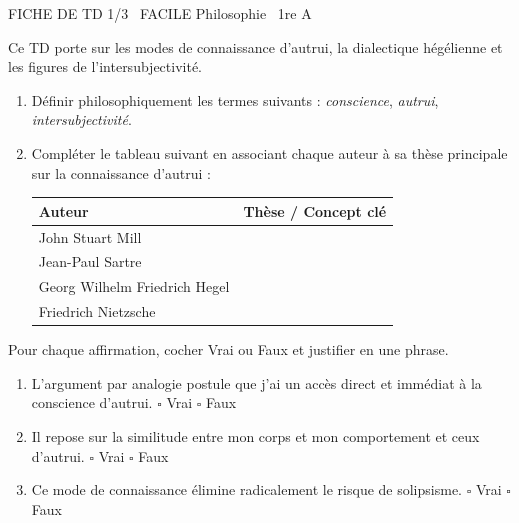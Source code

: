 \documentclass[11pt]{article}
\begin{document}
\begin{tcolorbox}[enhanced,colback=popink,colframe=popink,arc=10pt,boxrule=0pt,left=12pt,right=12pt,top=9pt,bottom=9pt]
{\color{white}\popxbold\small FICHE DE TD 1/3 \textbullet\ FACILE \hfill Philosophie \textbullet\ 1re A\par}
\end{tcolorbox}
\vspace{4pt}
Ce TD porte sur les modes de connaissance d'autrui, la dialectique hégélienne et les figures de l'intersubjectivité.

\begin{exercice}
\begin{enumerate}
    \item Définir philosophiquement les termes suivants : \textit{conscience}, \textit{autrui}, \textit{intersubjectivité}.
    \item Compléter le tableau suivant en associant chaque auteur à sa thèse principale sur la connaissance d'autrui :
    \begin{tabular}{|l|l|}
    \hline
    \textbf{Auteur} & \textbf{Thèse / Concept clé} \\ \hline
    John Stuart Mill & \\ \hline
    Jean-Paul Sartre & \\ \hline
    Georg Wilhelm Friedrich Hegel & \\ \hline
    Friedrich Nietzsche & \\ \hline
    \end{tabular}
\end{enumerate}
\end{exercice}

\begin{exercice}
Pour chaque affirmation, cocher Vrai ou Faux et justifier en une phrase.
\begin{enumerate}
    \item L'argument par analogie postule que j'ai un accès direct et immédiat à la conscience d'autrui. \hfill $\square$ Vrai \quad $\square$ Faux
    \item Il repose sur la similitude entre mon corps et mon comportement et ceux d'autrui. \hfill $\square$ Vrai \quad $\square$ Faux
    \item Ce mode de connaissance élimine radicalement le risque de solipsisme. \hfill $\square$ Vrai \quad $\square$ Faux
\end{enumerate}
\end{exercice}
\end{document}
